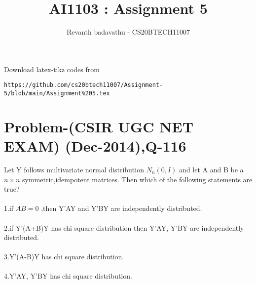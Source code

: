 \documentclass[journal,12pt,twocolumn]{IEEEtran}
\begin{document}
\let\vec\mathbf
\renewcommand{\thefigure}{\theproblem}
\def\putbox#1#2#3{\makebox[0in][l]{\makebox[#1][l]{}\raisebox{\baselineskip}[0in][0in]{\raisebox{#2}[0in][0in]{#3}}}}
     \def\rightbox#1{\makebox[0in][r]{#1}}
     \def\centbox#1{\makebox[0in]{#1}}
     \def\topbox#1{\raisebox{-\baselineskip}[0in][0in]{#1}}
     \def\midbox#1{\raisebox{-0.5\baselineskip}[0in][0in]{#1}}
\vspace{3cm}
\title{AI1103 : Assignment 5}
\author{Revanth badavathu - CS20BTECH11007}
\maketitle
\newpage
\bigskip
\renewcommand{\thefigure}{\arabic{figure}}
\renewcommand{\thetable}{\arabic{table}}

 Download latex-tikz codes from 
%
\begin{lstlisting}
https://github.com/cs20btech11007/Assignment-5/blob/main/Assignment%205.tex
\end{lstlisting}
\section*{\textbf{Problem-(CSIR UGC NET EXAM) (Dec-2014),Q-116}}
Let Y follows multivariate normal distribution $N_{n}(0,I)$ and let A and B be a $n\times n$ symmetric,idempotent matrices. Then which of the following statements are true? \\
\\1.if $AB=0$ ,then Y'AY and Y'BY are independently distributed.\\
\\2.if Y'(A+B)Y has chi square distribution then Y'AY, Y'BY are independently distributed.\\
\\3.Y'(A-B)Y has chi square distribution.\\
\\4.Y'AY, Y'BY has chi square distribution.\\
\end{document}
